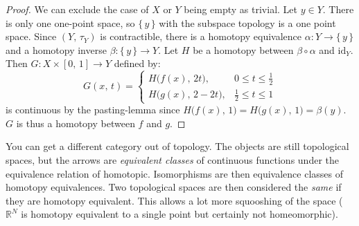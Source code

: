 \documentclass{article}
\theoremstyle{plain}
\theoremstyle{normal}
\begin{document}
            \begin{proof}
                We can exclude the case of $X$ or $Y$ being empty as trivial.
                Let $y\in{Y}$. There is only one one-point space, so
                $\{\,y\,\}$ with the subspace topology is a one point space.
                Since $(Y,\,\tau_{Y})$ is contractible, there is a homotopy
                equivalence $\alpha:Y\rightarrow\{\,y\,\}$ and a homotopy
                inverse $\beta:\{\,y\,\}\rightarrow{Y}$. Let
                $H$ be a homotopy between
                $\beta\circ\alpha$ and $\textrm{id}_{Y}$. Then
                $G:X\times[0,\,1]\rightarrow{Y}$ defined by:
                \begin{equation}
                    G(x,\,t)=
                    \begin{cases}
                        H\big(f(x),\,2t\big),&0\leq{t}\leq\frac{1}{2}\\
                        H\big(g(x),\,2-2t\big),&\frac{1}{2}\leq{t}\leq{1}
                    \end{cases}
                \end{equation}
                is continuous by the pasting-lemma since
                $H\big(f(x),\,1\big)=H\big(g(x),\,1\big)=\beta(y)$.
                $G$ is thus a homotopy between $f$ and $g$.
            \end{proof}
            You can get a different category out of topology. The objects are
            still topological spaces, but the arrows are
            \textit{equivalent classes} of continuous functions under the
            equivalence relation of homotopic. Isomorphisms are then
            equivalence classes of homotopy equivalences. Two topological
            spaces are then considered the \textit{same} if they are
            homotopy equivalent. This allows a lot more squooshing of the
            space ($\mathbb{R}^{N}$ is homotopy equivalent to a single point
            but certainly not homeomorphic).
\end{document}
